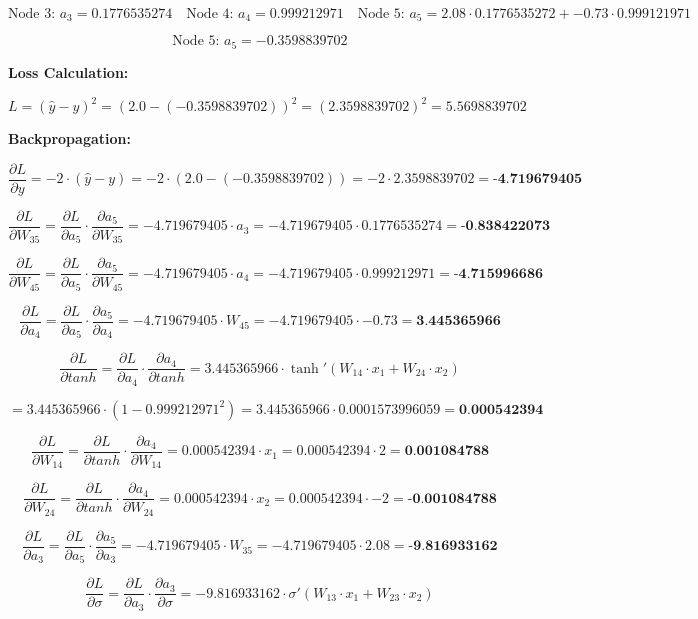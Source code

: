 \documentclass{article}
\begin{document}
\[
\text{Node 3: } a_3 = 0.1776535274 \quad \text{Node 4: } a_4 = 0.999212971 \quad \text{Node 5: } a_5 = 2.08 \cdot 0.1776535272 + -0.73 \cdot 0.999121971
\]

\[
\text{Node 5: } a_5 = -0.3598839702 
\]

\textbf{Loss Calculation:}

\[
L = (\hat{y} - y)^2 = (2.0 - (-0.3598839702))^2 = (2.3598839702)^2 = 5.5698839702
\]

\textbf{Backpropagation:}

\[
\frac{\partial L}{\partial y} = -2 \cdot (\hat{y} - y) = -2 \cdot (2.0 - (-0.3598839702)) = -2 \cdot 2.3598839702 = \textbf{-4.719679405}
\]

\[
\frac{\partial L}{\partial W_{35}} = \frac{\partial L}{\partial a_5} \cdot \frac{\partial a_5}{\partial W_{35}} = -4.719679405 \cdot a_3 = -4.719679405 \cdot 0.1776535274 = \textbf{-0.838422073}
\]

\[
\frac{\partial L}{\partial W_{45}} = \frac{\partial L}{\partial a_5} \cdot \frac{\partial a_5}{\partial W_{45}} = -4.719679405 \cdot a_4 = -4.719679405 \cdot 0.999212971 = \textbf{-4.715996686}
\]

\[
\frac{\partial L}{\partial a_4} = \frac{\partial L}{\partial a_5} \cdot \frac{\partial a_5}{\partial a_4} = -4.719679405 \cdot W_{45} = -4.719679405 \cdot -0.73 = \textbf{3.445365966}
\]

\[
\frac{\partial L}{\partial tanh} = \frac{\partial L}{\partial a_4} \cdot \frac{\partial a_4}{\partial tanh} = 3.445365966 \cdot \tanh'(W_{14} \cdot x_1 + W_{24} \cdot x_2)
\]

\[
= 3.445365966 \cdot (1 - 0.999212971^2) = 3.445365966 \cdot 0.0001573996059 = \textbf{0.000542394}
\]

\[
\frac{\partial L}{\partial W_{14}} = \frac{\partial L}{\partial tanh} \cdot \frac{\partial a_4}{\partial W_{14}} = 0.000542394 \cdot x_1 = 0.000542394 \cdot 2 = \textbf{0.001084788}
\]

\[
\frac{\partial L}{\partial W_{24}} = \frac{\partial L}{\partial tanh} \cdot \frac{\partial a_4}{\partial W_{24}} = 0.000542394 \cdot x_2 = 0.000542394 \cdot -2 = \textbf{-0.001084788}
\]

\[
\frac{\partial L}{\partial a_3} = \frac{\partial L}{\partial a_5} \cdot \frac{\partial a_5}{\partial a_3} = -4.719679405 \cdot W_{35} = -4.719679405 \cdot 2.08 = \textbf{-9.816933162}
\]

\[
\frac{\partial L}{\partial \sigma} = \frac{\partial L}{\partial a_3} \cdot \frac{\partial a_3}{\partial \sigma} = -9.816933162 \cdot \sigma'(W_{13} \cdot x_1 + W_{23} \cdot x_2)
\]
\end{document}
